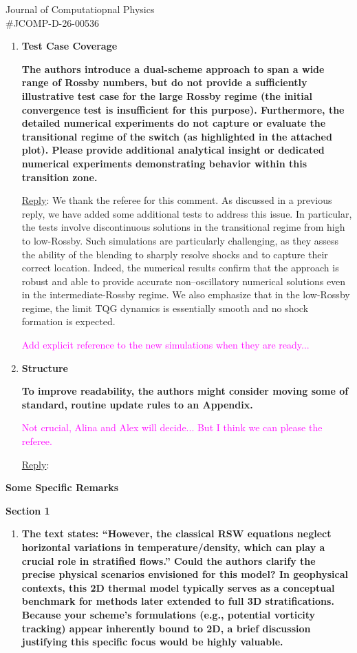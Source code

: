 \documentclass[letter,11pt]{letter}
\begin{document}
\begin{letter}{Journal of Computatiopnal Physics\\\#JCOMP-D-26-00536}
\begin{enumerate}
{\large \textcolor{magenta}{Nan, if you put one result without post-processing, we can emphasize here that the post-processing is necessary to correctly capture shocks.}}

\medskip
\item
{\bf Test Case Coverage}\medskip

{\bf The authors introduce a dual-scheme approach to span a wide range of Rossby numbers, but do not provide a sufficiently illustrative test case for the large Rossby regime (the initial convergence test is insufficient for this purpose). Furthermore, the detailed numerical experiments do not capture or evaluate the transitional regime of the switch (as highlighted in the attached plot). Please provide additional analytical insight or dedicated numerical experiments demonstrating behavior within this transition zone.}

\medskip
{\sc\underline{Reply}}: We thank the referee for this comment. As discussed in a previous reply, we have added some additional tests to address this issue. In particular, the tests involve discontinuous solutions in the transitional regime from high to low-Rossby.
%
Such simulations are particularly challenging, as they assess the ability of the blending to sharply resolve shocks and to capture their correct location.
%
Indeed, the numerical results confirm that the approach is robust and able to provide accurate non--oscillatory numerical solutions even in the intermediate-Rossby regime.
%
We also emphasize that in the low-Rossby regime, the limit TQG dynamics is essentially smooth and no shock formation is expected. 


{\large \textcolor{magenta}{Add explicit reference to the new simulations when they are ready...}}


\medskip
\item
{\bf Structure}\medskip

{\bf To improve readability, the authors might consider moving some of standard, routine update rules to an Appendix.}


{\large \textcolor{magenta}{Not crucial, Alina and Alex will decide... But I think we can please the referee.}}


\medskip
{\sc\underline{Reply}}: 
\end{enumerate}

{\bf Some Specific Remarks}

{\bf Section 1}
\begin{enumerate}
\medskip
\item
{\bf The text states: ``However, the classical RSW equations neglect horizontal variations in temperature/density, which can play a crucial role in stratified flows.'' Could the authors clarify the precise physical scenarios envisioned for this model? In geophysical contexts, this 2D thermal model typically serves as a conceptual benchmark for methods later extended to full 3D stratifications. Because your scheme’s formulations (e.g., potential vorticity tracking) appear inherently bound to 2D, a brief discussion justifying this specific focus would be highly valuable.}


\end{enumerate}
\end{letter}
\end{document}
